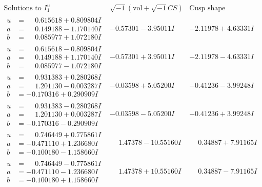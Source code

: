 \documentclass[1p]{elsarticle_modified}
\theoremstyle{definition}
\newcommand{\I}{\sqrt{-1}}
\begin{document}
$$\begin{array}{c|c|c}  
\text{Solutions to }I^u_{1}& \I (\text{vol} + \sqrt{-1}CS) & \text{Cusp shape}\\
 \hline 
\begin{aligned}
u &= \phantom{-}0.615618 + 0.809804 I \\
a &= \phantom{-}0.149188 - 1.170140 I \\
b &= \phantom{-}0.085977 + 1.072180 I\end{aligned}
 & -0.57301 - 3.95011 I & -2.11978 + 4.63331 I \\ \hline\begin{aligned}
u &= \phantom{-}0.615618 - 0.809804 I \\
a &= \phantom{-}0.149188 + 1.170140 I \\
b &= \phantom{-}0.085977 - 1.072180 I\end{aligned}
 & -0.57301 + 3.95011 I & -2.11978 - 4.63331 I \\ \hline\begin{aligned}
u &= \phantom{-}0.931383 + 0.280268 I \\
a &= \phantom{-}1.201130 - 0.003287 I \\
b &= -0.170316 + 0.290909 I\end{aligned}
 & -0.03598 + 5.05200 I & -0.41236 - 3.99248 I \\ \hline\begin{aligned}
u &= \phantom{-}0.931383 - 0.280268 I \\
a &= \phantom{-}1.201130 + 0.003287 I \\
b &= -0.170316 - 0.290909 I\end{aligned}
 & -0.03598 - 5.05200 I & -0.41236 + 3.99248 I \\ \hline\begin{aligned}
u &= \phantom{-}0.746449 + 0.775861 I \\
a &= -0.471110 + 1.236680 I \\
b &= -0.100180 - 1.158660 I\end{aligned}
 & \phantom{-}1.47378 - 10.55160 I & \phantom{-}0.34887 + 7.91165 I \\ \hline\begin{aligned}
u &= \phantom{-}0.746449 - 0.775861 I \\
a &= -0.471110 - 1.236680 I \\
b &= -0.100180 + 1.158660 I\end{aligned}
 & \phantom{-}1.47378 + 10.55160 I & \phantom{-}0.34887 - 7.91165 I \\ \hline\begin{aligned}

\end{aligned}
\end{array}$$
\end{document}
